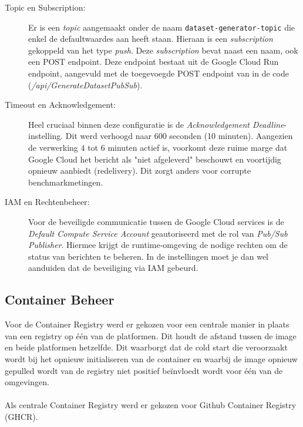 \begin{description}
    \item[Topic en Subscription:] 
    Er is een \textit{topic} aangemaakt onder de naam \texttt{dataset-generator-topic} die enkel de defaultwaardes aan heeft staan. Hieraan is een \textit{subscription} gekoppeld van het type \textit{push}. Deze \textit{subscription} bevat naast een naam, ook een POST endpoint. Deze endpoint bestaat uit de Google Cloud Run endpoint, aangevuld met de toegevoegde POST endpoint van in de code (\textit{/api/GenerateDatasetPubSub}).
    \item[Timeout en Acknowledgement:] 
    Heel cruciaal binnen deze configuratie is de \textit{Acknowledgement Deadline}-instelling. Dit werd verhoogd naar 600 seconden (10 minuten). Aangezien de verwerking 4 tot 6 minuten actief is, voorkomt deze ruime marge dat Google Cloud het bericht als "niet afgeleverd" beschouwt en voortijdig opnieuw aanbiedt (redelivery). Dit zorgt anders voor corrupte benchmarkmetingen.
    \item[IAM en Rechtenbeheer:] 
    Voor de beveiligde communicatie tussen de Google Cloud services is de \textit{Default Compute Service Account} geautoriseerd met de rol van \textit{Pub/Sub Publisher}. Hiermee krijgt de runtime-omgeving de nodige rechten om de status van berichten te beheren. In de instellingen moet je dan wel aanduiden dat de beveiliging via IAM gebeurd.
\end{description}

\subsection{Container Beheer}


Voor de Container Registry werd er gekozen voor een centrale manier in plaats van een registry op één van de platformen. Dit houdt de afstand tussen de image en beide platformen hetzelfde. Dit waarborgt dat de cold start die veroorzaakt wordt bij het opnieuw initialiseren van de container en waarbij de image opnieuw gepulled wordt van de registry niet positief beïnvloedt wordt voor één van de omgevingen. 
\\
\\
Als centrale Container Registry werd er gekozen voor Github Container Registry (GHCR).

